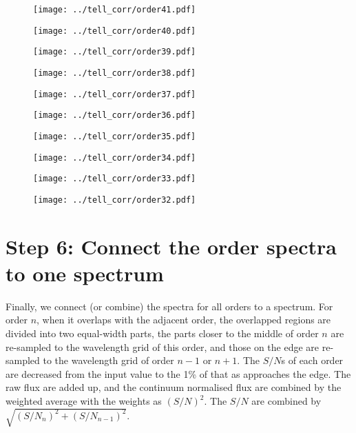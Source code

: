 \documentclass{article}
\begin{document}
\begin{figure}[H]
    \centering
    \texttt{[image: ../tell\_corr/order41.pdf]}
\end{figure}
\begin{figure}[H]
    \centering
    \texttt{[image: ../tell\_corr/order40.pdf]}
\end{figure}
\begin{figure}[H]
    \centering
    \texttt{[image: ../tell\_corr/order39.pdf]}
\end{figure}
\begin{figure}[H]
    \centering
    \texttt{[image: ../tell\_corr/order38.pdf]}
\end{figure}
\begin{figure}[H]
    \centering
    \texttt{[image: ../tell\_corr/order37.pdf]}
\end{figure}
\begin{figure}[H]
    \centering
    \texttt{[image: ../tell\_corr/order36.pdf]}
\end{figure}
\begin{figure}[H]
    \centering
    \texttt{[image: ../tell\_corr/order35.pdf]}
\end{figure}
\begin{figure}[H]
    \centering
    \texttt{[image: ../tell\_corr/order34.pdf]}
\end{figure}
\begin{figure}[H]
    \centering
    \texttt{[image: ../tell\_corr/order33.pdf]}
\end{figure}
\begin{figure}[H]
    \centering
    \texttt{[image: ../tell\_corr/order32.pdf]}
\end{figure}

\newpage

\section{Step 6: Connect the order spectra to one spectrum}

Finally, we connect (or combine) the spectra for all orders to a spectrum.
For order $n$, when it overlaps with the adjacent order, the overlapped regions are divided into two equal-width parts, the parts closer to the middle of order $n$ are re-sampled to the wavelength grid of this order, and those on the edge are re-sampled to the wavelength grid of order $n-1$ or $n+1$.
The $S/N$s of each order are decreased from the input value to the 1\% of that as approaches the edge. 
The raw flux are added up, and the continuum normalised flux are combined by the weighted average with the weights as $(S/N)^2$.
The $S/N$ are combined by $\sqrt{(S/N_n)^2 + (S/N_{n-1})^2}$.
\end{document}

